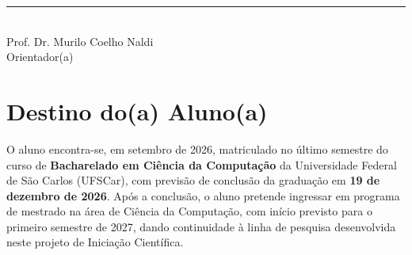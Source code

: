 \documentclass[12pt,a4paper,oneside]{article}
\begin{document}
\vspace{3cm}

\begin{center}
  \rule{10cm}{0.4pt}\\
  Prof. Dr. Murilo Coelho Naldi\\
  Orientador(a)
\end{center}

\section{Destino do(a) Aluno(a)}

O aluno encontra-se, em setembro de 2026, matriculado no último semestre do curso de
\textbf{Bacharelado em Ciência da Computação} da Universidade Federal de São Carlos (UFSCar),
com previsão de conclusão da graduação em \textbf{19 de dezembro de 2026}. Após a conclusão,
o aluno pretende ingressar em programa de mestrado na área de Ciência da Computação, com
início previsto para o primeiro semestre de 2027, dando continuidade à linha de pesquisa
desenvolvida neste projeto de Iniciação Científica.
\end{document}
